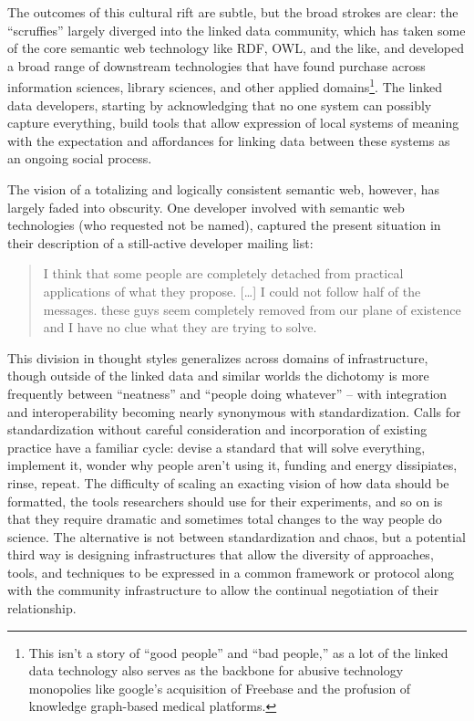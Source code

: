 \documentclass[10pt]{article}
\begin{document}
\begin{multicols}{2}
The outcomes of this cultural rift are subtle, but the broad strokes are
clear: the ``scruffies'' largely diverged into the linked data
community, which has taken some of the core semantic web technology like
RDF, OWL, and the like, and developed a broad range of downstream
technologies that have found purchase across information sciences,
library sciences, and other applied domains\footnote{This isn't a story
  of ``good people'' and ``bad people,'' as a lot of the linked data
  technology also serves as the backbone for abusive technology
  monopolies like google's acquisition of Freebase \cite{iainFreebaseDeadLong2019}  and the profusion of knowledge
  graph-based medical platforms.}. The linked data developers, starting
by acknowledging that no one system can possibly capture everything,
build tools that allow expression of local systems of meaning with the
expectation and affordances for linking data between these systems as an
ongoing social process.

The vision of a totalizing and logically consistent semantic web,
however, has largely faded into obscurity. One developer involved with
semantic web technologies (who requested not be named), captured the
present situation in their description of a still-active developer
mailing list:

\begin{quote}
I think that some people are completely detached from practical
applications of what they propose. {[}\ldots{]} I could not follow half
of the messages. these guys seem completely removed from our plane of
existence and I have no clue what they are trying to solve.
\end{quote}

This division in thought styles generalizes across domains of
infrastructure, though outside of the linked data and similar worlds the
dichotomy is more frequently between ``neatness'' and ``people doing
whatever'' -- with integration and interoperability becoming nearly
synonymous with standardization. Calls for standardization without
careful consideration and incorporation of existing practice have a
familiar cycle: devise a standard that will solve everything, implement
it, wonder why people aren't using it, funding and energy dissipiates,
rinse, repeat. The difficulty of scaling an exacting vision of how data
should be formatted, the tools researchers should use for their
experiments, and so on is that they require dramatic and sometimes total
changes to the way people do science. The alternative is not between
standardization and chaos, but a potential third way is designing
infrastructures that allow the diversity of approaches, tools, and
techniques to be expressed in a common framework or protocol along with
the community infrastructure to allow the continual negotiation of their
relationship.


\end{multicols}
\end{document}
